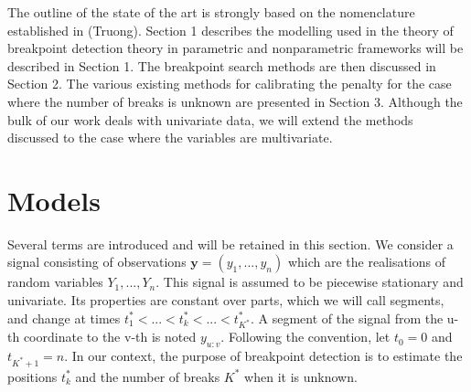 The outline of the state of the art is strongly based on the nomenclature established in (Truong). Section 1 describes the modelling used in the theory of breakpoint detection theory in parametric and nonparametric frameworks will be described in Section 1. The breakpoint search methods are then discussed in Section 2. The various existing methods for calibrating the penalty for the case where the number of breaks is unknown are presented in Section 3. Although the bulk of our work deals with univariate data, we will extend the methods discussed to the case where the variables are multivariate.


\section{Models}\label{chp2:model}

Several terms are introduced and will be retained in this section. We consider a signal consisting of observations $\bm y = (y_1,...,y_n)$ which are the realisations of random variables $Y_1,...,Y_n$. This signal is assumed to be piecewise stationary and univariate. Its properties are constant over parts, which we will call segments, and change at times $t_1^* <... < t_k^* <... < t_{K^*}^*$. A segment of the signal from the u-th coordinate to the v-th is noted $y_{u:v}$. Following the convention, let $t_0 = 0$ and $t_{K^*+1} = n$. In our context, the purpose of breakpoint detection is to estimate the positions $t_k^*$ and the number of breaks $K^*$ when it is unknown. 

